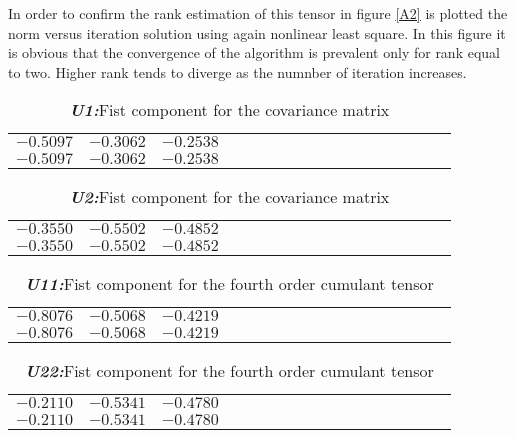 In order to confirm the rank estimation of this tensor in figure \ref{A2} is plotted the norm versus iteration solution using again nonlinear least square. In this figure it is obvious that the convergence of the algorithm is prevalent only for rank equal to two. Higher rank tends to diverge as the numnber of iteration increases.











\newpage


\begin{table}[!htbp]
\centering
\caption{\textbf{\textit{U1:}}Fist component for the covariance matrix}\label{a5}
\begin{tabular}{c c c c c c c c c c c c c c c c c} 
  \hline  
   $-0.5097$&$-0.3062$&$-0.2538$\\
   $-0.5097$&$-0.3062$&$-0.2538$\\
 \hline
\end{tabular}
\end{table}

  \begin{table}[!htbp]
\centering
\caption{\textbf{\textit{U2:}}Fist component for the covariance matrix}\label{a6}
\begin{tabular}{c c c c c c c c c c c c c c c c c} 
  \hline  

   $-0.3550$&$-0.5502$&$-0.4852$\\
   $-0.3550$&$-0.5502$&$-0.4852$\\
 \hline
\end{tabular}
\end{table}


  \begin{table}[!htbp]
\centering
\caption{\textbf{\textit{U11:}}Fist component for the fourth order cumulant tensor}\label{a7}
\begin{tabular}{c c c c c c c c c c c c c c c c c} 
  \hline  
   $-0.8076$&$-0.5068$&$-0.4219$\\
   $-0.8076$&$-0.5068$&$-0.4219$\\
 \hline
\end{tabular}
\end{table}

     
  \begin{table}[!htbp]
\centering
\caption{\textbf{\textit{U22:}}Fist component for the fourth order cumulant tensor}\label{a8}
\begin{tabular}{c c c c c c c c c c c c c c c c c} 
  \hline  
   $-0.2110$&$-0.5341$&$-0.4780$\\
   $-0.2110$&$-0.5341$&$-0.4780$\\
   
 \hline
\end{tabular}
\end{table}

